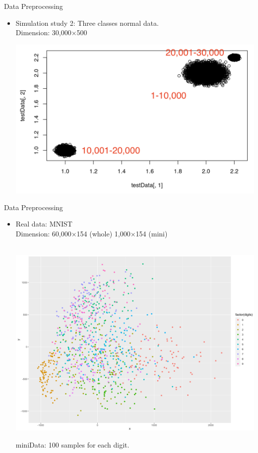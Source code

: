 \documentclass[10 pt]{beamer}
\begin{document}
\begin{frame}{Data Preprocessing}
	\begin{itemize}
		\item Simulation study 2: Three classes normal data.
		\\
		Dimension: 30,000$\times$500
		\\
		\centerline{\includegraphics[scale=0.4]{figs/simulationData2.png}}
	\end{itemize}
\end{frame}



\begin{frame}{Data Preprocessing}
	\begin{itemize}
		\item Real data: MNIST		
		\\
		Dimension: 60,000$\times$154 (whole) 1,000$\times$154 (mini)
		~\\
		~\\
		\centerline{\includegraphics[scale=0.2]{figs/MNIST_mini.png}}
		miniData: 100 samples for each digit.
	\end{itemize}
\end{frame}
\end{document}
